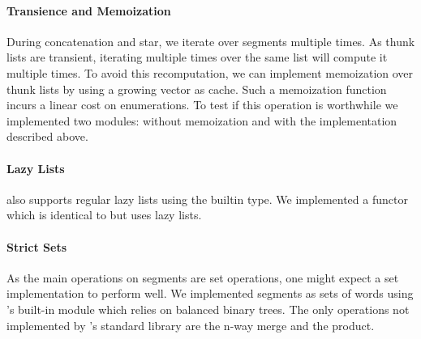 \paragraph{Transience and Memoization}

During concatenation and star, we iterate over segments multiple times.
As thunk lists are transient, iterating multiple times over the same list
will compute it multiple times. To avoid this recomputation, we can implement memoization
over thunk lists by using a growing vector as cache.
%
Such a memoization function incurs a linear cost on enumerations. To test
if this operation is worthwhile we implemented two modules:
 without memoization and 
with the implementation described above.

\paragraph{Lazy Lists}

\ocaml also supports regular lazy lists using the builtin  type.
%
%
We implemented a  functor which is identical to
 but uses lazy lists.

\paragraph{Strict Sets}

As the main operations on segments are set operations, one might 
expect a set implementation to perform well. We implemented segments as sets
of words using \ocaml's built-in  module which relies on
balanced binary trees.
The only operations not implemented by \ocaml's standard library are
the n-way merge and the product.


